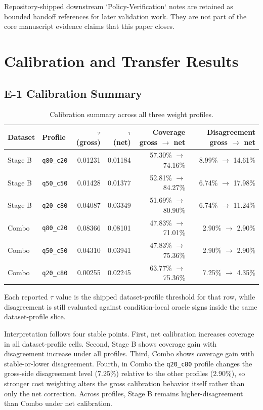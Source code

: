 \documentclass[11pt,a4paper]{article}
\begin{document}
Repository-shipped downstream `Policy-Verification` notes are retained as bounded handoff references for later validation work. They are not part of the core manuscript evidence claims that this paper closes.

\section{Calibration and Transfer Results}
\label{sec:results}

\subsection{E-1 Calibration Summary}
\label{sec:e1summary}

\begin{table}[ht]
\centering
\small
\begin{tabular}{@{}llrrrr@{}}
\toprule
Dataset & Profile & $\tau$ (gross) & $\tau$ (net) & Coverage gross $\rightarrow$ net & Disagreement gross $\rightarrow$ net \\
\midrule
Stage B & \texttt{q80\_c20} & 0.01231 & 0.01184 & 57.30\% $\rightarrow$ 74.16\% & 8.99\% $\rightarrow$ 14.61\% \\
Stage B & \texttt{q50\_c50} & 0.01428 & 0.01377 & 52.81\% $\rightarrow$ 84.27\% & 6.74\% $\rightarrow$ 17.98\% \\
Stage B & \texttt{q20\_c80} & 0.04087 & 0.03349 & 51.69\% $\rightarrow$ 80.90\% & 6.74\% $\rightarrow$ 11.24\% \\
Combo & \texttt{q80\_c20} & 0.08366 & 0.08101 & 47.83\% $\rightarrow$ 71.01\% & 2.90\% $\rightarrow$ 2.90\% \\
Combo & \texttt{q50\_c50} & 0.04310 & 0.03941 & 47.83\% $\rightarrow$ 75.36\% & 2.90\% $\rightarrow$ 2.90\% \\
Combo & \texttt{q20\_c80} & 0.00255 & 0.02245 & 63.77\% $\rightarrow$ 75.36\% & 7.25\% $\rightarrow$ 4.35\% \\
\bottomrule
\end{tabular}
\caption{Calibration summary across all three weight profiles.}
\label{tab:e1_summary}
\end{table}

Each reported $\tau$ value is the shipped dataset-profile threshold for that
row, while disagreement is still evaluated against condition-local oracle
signs inside the same dataset-profile slice.

Interpretation follows four stable points. First, net calibration increases coverage in all dataset-profile cells. Second, Stage B shows coverage gain with disagreement increase under all profiles. Third, Combo shows coverage gain with stable-or-lower disagreement. Fourth, in Combo the \texttt{q20\_c80} profile changes the gross-side disagreement level (7.25\%) relative to the other profiles (2.90\%), so stronger cost weighting alters the gross calibration behavior itself rather than only the net correction. Across profiles, Stage B remains higher-disagreement than Combo under net calibration.
\end{document}
